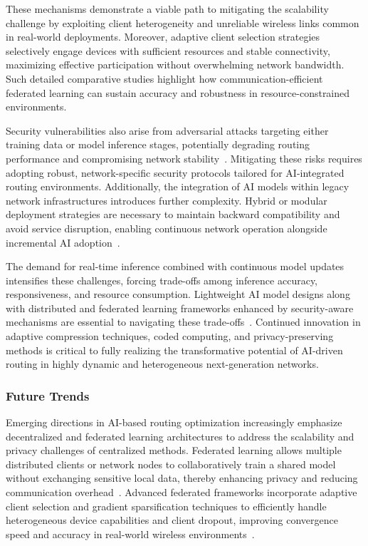 \documentclass[sigconf]{acmart}
\begin{document}
These mechanisms demonstrate a viable path to mitigating the scalability challenge by exploiting client heterogeneity and unreliable wireless links common in real-world deployments. Moreover, adaptive client selection strategies selectively engage devices with sufficient resources and stable connectivity, maximizing effective participation without overwhelming network bandwidth. Such detailed comparative studies highlight how communication-efficient federated learning can sustain accuracy and robustness in resource-constrained environments.

Security vulnerabilities also arise from adversarial attacks targeting either training data or model inference stages, potentially degrading routing performance and compromising network stability~\cite{ref4,ref53}. Mitigating these risks requires adopting robust, network-specific security protocols tailored for AI-integrated routing environments. Additionally, the integration of AI models within legacy network infrastructures introduces further complexity. Hybrid or modular deployment strategies are necessary to maintain backward compatibility and avoid service disruption, enabling continuous network operation alongside incremental AI adoption~\cite{ref48}.

The demand for real-time inference combined with continuous model updates intensifies these challenges, forcing trade-offs among inference accuracy, responsiveness, and resource consumption. Lightweight AI model designs along with distributed and federated learning frameworks enhanced by security-aware mechanisms are essential to navigating these trade-offs~\cite{ref4,ref53}. Continued innovation in adaptive compression techniques, coded computing, and privacy-preserving methods is critical to fully realizing the transformative potential of AI-driven routing in highly dynamic and heterogeneous next-generation networks.

\subsubsection{Future Trends}

Emerging directions in AI-based routing optimization increasingly emphasize decentralized and federated learning architectures to address the scalability and privacy challenges of centralized methods. Federated learning allows multiple distributed clients or network nodes to collaboratively train a shared model without exchanging sensitive local data, thereby enhancing privacy and reducing communication overhead~\cite{ref53}. Advanced federated frameworks incorporate adaptive client selection and gradient sparsification techniques to efficiently handle heterogeneous device capabilities and client dropout, improving convergence speed and accuracy in real-world wireless environments~\cite{ref49}.
\end{document}
